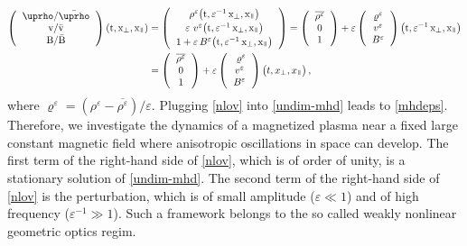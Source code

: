 \documentclass[11pt,reqno]{amsart}
\newcommand{\myparallel}{{\mkern3mu\vphantom{\perp}\vrule depth 0pt\mkern2mu\vrule depth 0pt\mkern3mu}}
\begin{document}
\begin{align}
  \left(\begin{tabular}{c}
  $\uprho/\bar{\uprho}$\\ 
  $\text{v}/\bar{\text{v}}$\\
  $\text{B}/\bar{\text{B}}$
\end{tabular}
\right)
(\text{t},\text{x}_\perp,\text{x}_\myparallel) 
&= \left(\begin{tabular}{c}
  $\rho^\varepsilon\big(\text{t},{\varepsilon}^{-1}\,\text{x}_\perp,\text{x}_\myparallel\big)$\vspace{2pt}\\  
  $\varepsilon \, \,v^\varepsilon\big(\text{t}, {\varepsilon}^{-1}\,\text{x}_\perp ,\text{x}_\myparallel\big)$\vspace{2pt}\\
  $1+\varepsilon\, B^\varepsilon\big(\text{t},{\varepsilon}^{-1}\,\text{x}_\perp,\text{x}_\myparallel\big)$
\end{tabular}
\right)=
\left(\begin{tabular}{c}
  $ \overline{\rho^\varepsilon}$\\ 
  $ 0$\\
  $ 1$
\end{tabular}
\right)
+ \varepsilon
\left(\begin{tabular}{c}
  $ \varrho^\varepsilon$\\ 
  $ v^\varepsilon$\\
  $B^\varepsilon$
\end{tabular}
\right)\big(\text{t},{\varepsilon}^{-1}\,\text{x}_\perp,\text{x}_\myparallel\big) \nonumber\\
&=
\left(\begin{tabular}{c}
  $\overline{\rho^\varepsilon}$\\ 
  $ 0$\\
  $ 1$
\end{tabular}
\right)
+ \varepsilon
\left(\begin{tabular}{c}
  $\ \varrho^\varepsilon$\\ 
  $v^\varepsilon$\\
  $B^\varepsilon$
\end{tabular}
\right)\big(t,x_\perp,x_\myparallel\big) \,, \label{nlov}
\end{align}  
where $\varrho^\varepsilon =(\rho^\varepsilon -\overline{\rho^\varepsilon})/\varepsilon$. Plugging \eqref{nlov} into \eqref{undim-mhd} leads to \eqref{mhdeps}. Therefore, we investigate the dynamics of a magnetized plasma near a fixed large constant magnetic field  where anisotropic oscillations in space can develop. The first term of the right-hand side of \eqref{nlov}, which is of order of unity, is a stationary solution of \eqref{undim-mhd}. The second term of the right-hand side of \eqref{nlov} is the perturbation, which is of small amplitude ($\varepsilon \ll 1$) and of high frequency ($ \varepsilon^{-1}\gg 1$). Such a framework belongs to the so called weakly nonlinear geometric optics regim.
\end{document}

